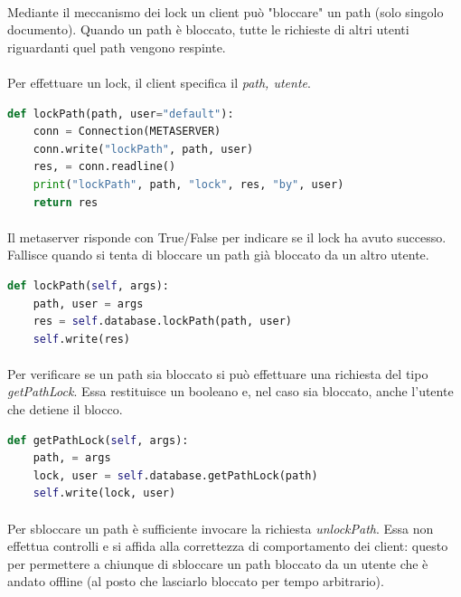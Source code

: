 \documentclass{article}
\begin{document}
\paragraph{} Mediante il meccanismo dei lock un client può "bloccare" un path (solo singolo documento). Quando un path è bloccato, tutte le richieste di altri utenti riguardanti quel path vengono respinte. 

\paragraph{} Per effettuare un lock, il client specifica il \emph{path, utente}. 

\begin{lstlisting}[language=Python, title=Client]
def lockPath(path, user="default"):
    conn = Connection(METASERVER)
    conn.write("lockPath", path, user)
    res, = conn.readline()
    print("lockPath", path, "lock", res, "by", user)
    return res
\end{lstlisting}

\paragraph{} Il metaserver risponde con True/False per indicare se il lock ha avuto successo. Fallisce quando si tenta di bloccare un path già bloccato da un altro utente.

\begin{lstlisting}[language=Python, title=Metaserver]
def lockPath(self, args):
    path, user = args
    res = self.database.lockPath(path, user)
    self.write(res)
\end{lstlisting}

\paragraph{} Per verificare se un path sia bloccato si può effettuare una richiesta del tipo \emph{getPathLock}. Essa restituisce un booleano e, nel caso sia bloccato, anche l'utente che detiene il blocco.

\begin{lstlisting}[language=Python, title=Metaserver]
def getPathLock(self, args):
    path, = args
    lock, user = self.database.getPathLock(path)
    self.write(lock, user)
\end{lstlisting}

\paragraph{} Per sbloccare un path è sufficiente invocare la richiesta \emph{unlockPath}. Essa non effettua controlli e si affida alla correttezza di comportamento dei client: questo per permettere a chiunque di sbloccare un path bloccato da un utente che è andato offline (al posto che lasciarlo bloccato per tempo arbitrario). 
\end{document}
